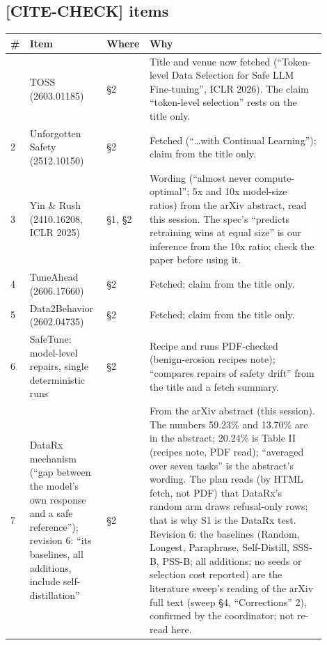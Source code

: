\documentclass{article}
\theoremstyle{plain}
\theoremstyle{definition}
\theoremstyle{remark}
\begin{document}
\subsection{[CITE-CHECK] items}

\begin{longtable}{@{}L{0.03\linewidth}L{0.24\linewidth}L{0.08\linewidth}L{0.55\linewidth}@{}}
  \toprule
  \textbf{\#} & \textbf{Item} & \textbf{Where} & \textbf{Why} \\
  \midrule
  \endhead
  \bottomrule
   & TOSS (2603.01185) & \S{}2 & Title and venue now fetched (``Token-level
      Data Selection for Safe LLM Fine-tuning'', ICLR 2026). The claim
      ``token-level selection'' rests on the title only. \\
  2 & Unforgotten Safety (2512.10150) & \S{}2 & Fetched (``\ldots{}with
      Continual Learning''); claim from the title only. \\
  3 & Yin \& Rush (2410.16208, ICLR 2025) & \S{}1, \S{}2 & Wording (``almost
      never compute-optimal''; 5x and 10x model-size ratios) from the arXiv
      abstract, read this session. The spec's ``predicts retraining wins at
      equal size'' is our inference from the 10x ratio; check the paper before
      using it. \\
  4 & TuneAhead (2606.17660) & \S{}2 & Fetched; claim from the title only. \\
  5 & Data2Behavior (2602.04735) & \S{}2 & Fetched; claim from the title only.
      \\
  6 & SafeTune: model-level repairs, single deterministic runs & \S{}2 & Recipe
      and runs PDF-checked (benign-erosion recipes note); ``compares repairs of
      safety drift'' from the title and a fetch summary. \\
  7 & DataRx mechanism (``gap between the model's own response and a safe
      reference''); revision 6: ``its baselines, all additions, include
      self-distillation'' & \S{}2 & From the arXiv abstract (this session). The
      numbers 59.23\% and 13.70\% are in the abstract; 20.24\% is Table II
      (recipes note, PDF read); ``averaged over seven tasks'' is the abstract's
      wording. The plan reads (by HTML fetch, not PDF) that DataRx's random arm
      draws refusal-only rows; that is why S1 is the DataRx test. Revision 6:
      the baselines (Random, Longest, Paraphrase, Self-Distill, SSS-B, PSS-B;
      all additions; no seeds or selection cost reported) are the literature
      sweep's reading of the arXiv full text (sweep \S{}4, ``Corrections'' 2),
      confirmed by the coordinator; not re-read here. \\

\end{longtable}
\end{document}
